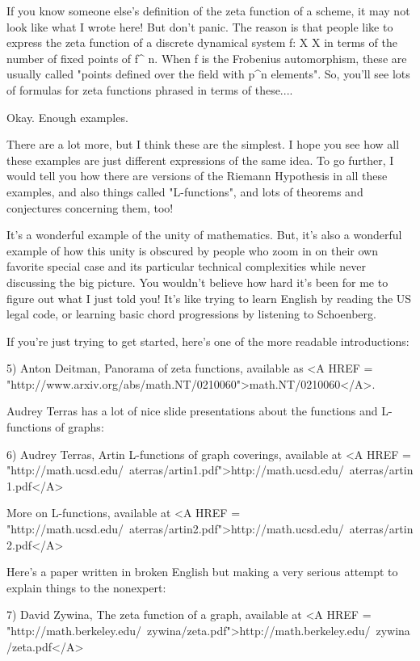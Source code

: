 If you know someone else's definition of the zeta function of a scheme, 
it may not look like what I wrote here!   But don't panic.  The reason is 
that people like to express the zeta function of a discrete dynamical system 
f: X \to  X in terms of the number of fixed points of f^{ n}.  
When f is the 
Frobenius automorphism, these are usually called "points defined over the 
field with p^{n} elements".  So, you'll see lots of formulas for 
zeta functions phrased in terms of these....

Okay.  Enough examples.

There are a lot more, but I think these are the simplest.  I hope you see 
how all these examples are just different expressions of the same idea.
To go further, I would tell you how there are versions of the Riemann 
Hypothesis in all these examples, and also things called "L-functions", 
and lots of theorems and conjectures concerning them, too!  

It's a wonderful example of the unity of mathematics.  But, it's also
a wonderful example of how this unity is obscured by people who zoom 
in on their own favorite special case and its particular technical 
complexities while never discussing the big picture.  You wouldn't 
believe how hard it's been for me to figure out what I just told you! 
It's like trying to learn English by reading the US legal code, or
learning basic chord progressions by listening to Schoenberg.  

If you're just trying to get started, here's one of the more readable 
introductions:

5) Anton Deitman, Panorama of zeta functions, available as 
<A HREF = "http://www.arxiv.org/abs/math.NT/0210060">math.NT/0210060</A>.

Audrey Terras has a lot of nice slide presentations about the \zeta  functions 
and L-functions of graphs:

6) Audrey Terras, Artin L-functions of graph coverings, 
available at 
<A HREF = "http://math.ucsd.edu/~aterras/artin1.pdf">http://math.ucsd.edu/~aterras/artin1.pdf</A>

More on L-functions, available at 
<A HREF = "http://math.ucsd.edu/~aterras/artin2.pdf">http://math.ucsd.edu/~aterras/artin2.pdf</A>

Here's a paper written in broken English but making a very serious attempt 
to explain things to the nonexpert:

7) David Zywina, The zeta function of a graph, available at
<A HREF = "http://math.berkeley.edu/~zywina/zeta.pdf">http://math.berkeley.edu/~zywina/zeta.pdf</A>

